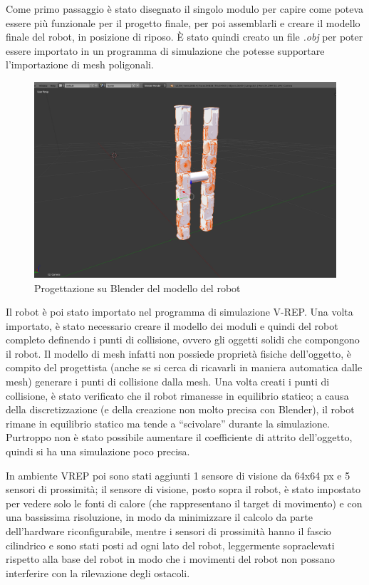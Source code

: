 \documentclass[a4paper,titlepage]{book}
\begin{document}
Come primo passaggio è stato disegnato il singolo modulo per capire come poteva essere più funzionale per il progetto finale, per poi assemblarli e creare il modello finale del robot, in posizione di riposo. È stato quindi creato un file \textit{.obj} per poter essere importato in un programma di simulazione che potesse supportare l'importazione di mesh poligonali.

\begin{figure}[htbp]
\centering
\includegraphics[scale=0.2]{screen_blender.png}
\caption{Progettazione su Blender del modello del robot}\label{fig:9}
\end{figure}

Il robot è poi stato importato nel programma di simulazione V-REP. Una volta importato, è stato necessario creare il modello dei moduli e quindi del robot completo definendo i punti di collisione, ovvero gli oggetti solidi che compongono il robot. Il modello di mesh infatti non possiede proprietà fisiche dell'oggetto, è compito del progettista (anche se si cerca di ricavarli in maniera automatica dalle mesh) generare i punti di collisione dalla mesh.
Una volta creati i punti di collisione, è stato verificato che il robot rimanesse in equilibrio statico; a causa della discretizzazione (e della creazione non molto precisa con Blender), il robot rimane in equilibrio statico ma tende a ``scivolare'' durante la simulazione. Purtroppo non è stato possibile aumentare il coefficiente di attrito dell'oggetto, quindi si ha una simulazione poco precisa.

In ambiente VREP poi sono stati aggiunti 1 sensore di visione da 64x64 px e 5 sensori di prossimità; il sensore di visione, posto sopra il robot, è stato impostato per vedere solo le fonti di calore (che rappresentano il target di movimento) e con una bassissima risoluzione, in modo da minimizzare il calcolo da parte dell'hardware riconfigurabile, mentre i sensori di prossimità hanno il fascio cilindrico e sono stati posti ad ogni lato del robot, leggermente sopraelevati rispetto alla base del robot in modo che i movimenti del robot non possano interferire con la rilevazione degli ostacoli.
\end{document}
